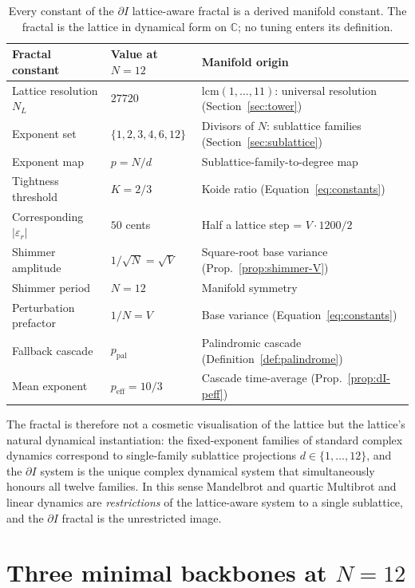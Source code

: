\documentclass[11pt,a4paper]{article}
\theoremstyle{definition}
\theoremstyle{remark}
\newcommand{\C}{\mathbb{C}}
\begin{document}
\begin{table}[h]
\centering
\begin{tabular}{@{}l l l@{}}
\toprule
Fractal constant & Value at $N=12$ & Manifold origin\\
\midrule
Lattice resolution $N_{L}$ & $27720$ & $\mathrm{lcm}(1,\ldots,11)$: universal resolution (Section~\ref{sec:tower})\\
Exponent set & $\{1,2,3,4,6,12\}$ & Divisors of $N$: sublattice families (Section~\ref{sec:sublattice})\\
Exponent map & $p = N/d$ & Sublattice-family-to-degree map\\
Tightness threshold & $K = 2/3$ & Koide ratio (Equation~\eqref{eq:constants})\\
Corresponding $|\varepsilon_{r}|$ & $50$ cents & Half a lattice step = $V\cdot 1200/2$\\
Shimmer amplitude & $1/\sqrt{N} = \sqrt{V}$ & Square-root base variance (Prop.~\ref{prop:shimmer-V})\\
Shimmer period & $N=12$ & Manifold symmetry\\
Perturbation prefactor & $1/N = V$ & Base variance (Equation~\eqref{eq:constants})\\
Fallback cascade & $p_{\mathrm{pal}}$ & Palindromic cascade (Definition~\ref{def:palindrome})\\
Mean exponent & $p_{\mathrm{eff}} = 10/3$ & Cascade time-average (Prop.~\ref{prop:dI-peff})\\
\bottomrule
\end{tabular}
\caption{Every constant of the $\partial I$ lattice-aware fractal is a derived manifold constant. The fractal is the lattice in dynamical form on $\C$; no tuning enters its definition.}
\label{tab:fractal-constants}
\end{table}

The fractal is therefore not a cosmetic visualisation of the lattice but the lattice's natural dynamical instantiation: the fixed-exponent families of standard complex dynamics correspond to single-family sublattice projections $d\in\{1,\ldots,12\}$, and the $\partial I$ system is the unique complex dynamical system that simultaneously honours all twelve families. In this sense Mandelbrot and quartic Multibrot and linear dynamics are \emph{restrictions} of the lattice-aware system to a single sublattice, and the $\partial I$ fractal is the unrestricted image.

\section{Three minimal backbones at $N=12$}\label{sec:backbones}
\end{document}
